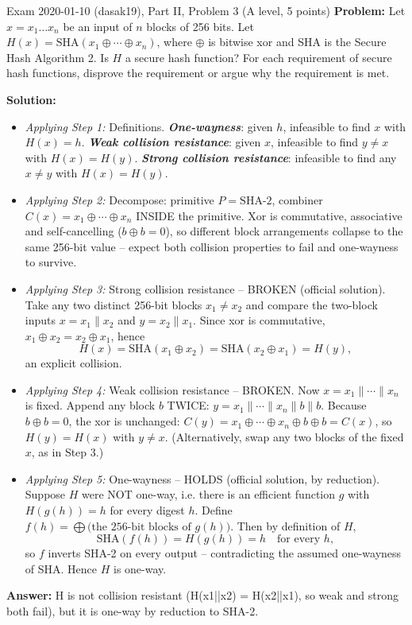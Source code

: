 \documentclass[12pt, a4paper]{article}
\newcommand{\term}[1]{\textbf{\textit{#1}}}        %
\begin{document}
\begin{practicebox}{Exam 2020-01-10 (dasak19), Part II, Problem 3 (A level, 5 points)}
\textbf{Problem:} Let $x = x_1 \dots x_n$ be an input of $n$ blocks of 256 bits. Let $H(x) = \mathrm{SHA}(x_1 \oplus \cdots \oplus x_n)$, where $\oplus$ is bitwise xor and SHA is the Secure Hash Algorithm 2. Is $H$ a secure hash function? For each requirement of secure hash functions, disprove the requirement or argue why the requirement is met.

\textbf{Solution:}
\begin{itemize}
    \item \textit{Applying Step 1:} Definitions. \term{One-wayness}: given $h$, infeasible to find $x$ with $H(x) = h$. \term{Weak collision resistance}: given $x$, infeasible to find $y \neq x$ with $H(x) = H(y)$. \term{Strong collision resistance}: infeasible to find any $x \neq y$ with $H(x) = H(y)$.
    \item \textit{Applying Step 2:} Decompose: primitive $P = \mathrm{SHA\text{-}2}$, combiner $C(x) = x_1 \oplus \cdots \oplus x_n$ INSIDE the primitive. Xor is commutative, associative and self-cancelling ($b \oplus b = 0$), so different block arrangements collapse to the same 256-bit value -- expect both collision properties to fail and one-wayness to survive.
    \item \textit{Applying Step 3:} Strong collision resistance -- BROKEN (official solution). Take any two distinct 256-bit blocks $x_1 \neq x_2$ and compare the two-block inputs $x = x_1 \| x_2$ and $y = x_2 \| x_1$. Since xor is commutative, $x_1 \oplus x_2 = x_2 \oplus x_1$, hence
\[ H(x) = \mathrm{SHA}(x_1 \oplus x_2) = \mathrm{SHA}(x_2 \oplus x_1) = H(y), \]
an explicit collision.
    \item \textit{Applying Step 4:} Weak collision resistance -- BROKEN. Now $x = x_1 \| \cdots \| x_n$ is fixed. Append any block $b$ TWICE: $y = x_1 \| \cdots \| x_n \| b \| b$. Because $b \oplus b = 0$, the xor is unchanged: $C(y) = x_1 \oplus \cdots \oplus x_n \oplus b \oplus b = C(x)$, so $H(y) = H(x)$ with $y \neq x$. (Alternatively, swap any two blocks of the fixed $x$, as in Step 3.)
    \item \textit{Applying Step 5:} One-wayness -- HOLDS (official solution, by reduction). Suppose $H$ were NOT one-way, i.e. there is an efficient function $g$ with $H(g(h)) = h$ for every digest $h$. Define $f(h) = \bigoplus \text{(the 256-bit blocks of } g(h) \text{)}$. Then by definition of $H$,
\[ \mathrm{SHA}(f(h)) = H(g(h)) = h \quad \text{for every } h, \]
so $f$ inverts SHA-2 on every output -- contradicting the assumed one-wayness of SHA. Hence $H$ is one-way.
\end{itemize}
\textbf{Answer:} H is not collision resistant (H(x1||x2) = H(x2||x1), so weak and strong both fail), but it is one-way by reduction to SHA-2.
\end{practicebox}
\end{document}
